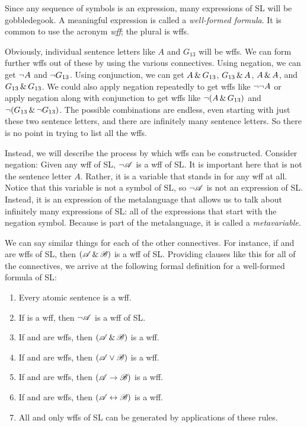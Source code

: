Since any sequence of symbols is an expression, many expressions of SL will be gobbledegook. A meaningful expression is called a \emph{well-formed formula}. It is common to use the acronym \emph{wff}; the plural is wffs.

Obviously, individual sentence letters like $A$ and $G_{13}$ will be wffs. We can form further wffs out of these by using the various connectives. Using negation, we can get $\neg A$ and $\neg G_{13}$. Using conjunction, we can get $A \,\&\, G_{13}$, $G_{13} \,\&\, A$, $A \,\&\, A$, and $G_{13} \,\&\, G_{13}$. We could also apply negation repeatedly to get wffs like $\neg \neg A$ or apply negation along with conjunction to get wffs like $\neg(A \,\&\, G_{13})$ and $\neg(G_{13} \,\&\, \neg G_{13})$. The possible combinations are endless, even starting with just these two sentence letters, and there are infinitely many sentence letters. So there is no point in trying to list all the wffs.

Instead, we will describe the process by which wffs can be constructed. Consider negation: Given any wff  of SL, $\neg\mathscr{A}$ is a wff of SL. It is important here that  is not the sentence letter $A$. Rather, it is a variable that stands in for any wff at all. Notice that this variable  is not a symbol of SL, so $\neg\mathscr{A}$ is not an expression of SL. Instead, it is an expression of the metalanguage that allows us to talk about infinitely many expressions of SL: all of the expressions that start with the negation symbol. Because  is part of the metalanguage, it is called a \emph{metavariable}.

We can say similar things for each of the other connectives. For instance, if  and  are wffs of SL, then $(\mathscr{A}\,\&\,\mathscr{B})$ is a wff of SL. Providing clauses like this for all of the connectives, we arrive at the following formal definition for a {well-formed formula of SL}:

\begin{enumerate}
\item Every atomic sentence is a wff.
\item If  is a wff, then $\neg\mathscr{A}$ is a wff of SL.
\item If  and  are wffs, then $(\mathscr{A}\,\&\,\mathscr{B})$ is a wff.
\item If  and  are wffs, then $(\mathscr{A}\vee\mathscr{B})$ is a wff.
\item If  and  are wffs, then $(\mathscr{A}\rightarrow\mathscr{B})$ is a wff.
\item If  and  are wffs, then $(\mathscr{A}\leftrightarrow\mathscr{B})$ is a wff.
\item All and only wffs of SL can be generated by applications of these rules.
\end{enumerate}


